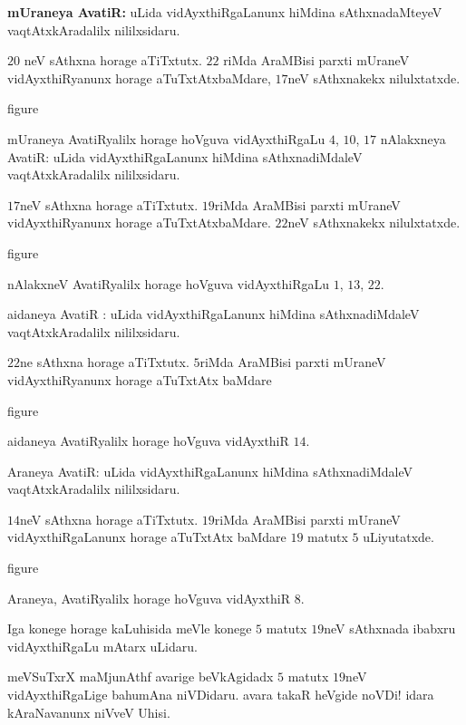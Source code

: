 {\bf mUraneya AvatiR:} uLida vidAyxthiRgaLanunx hiMdina sAthxnadaMteyeV vaqtAtxkAradalilx nililxsidaru.

$20$ neV sAthxna horage aTiTxtutx. $22$ riMda AraMBisi parxti mUraneV vidAyxthiRyanunx horage aTuTxtAtxbaMdare, $17$neV sAthxnakekx nilulxtatxde. 
\begin{center}
{\rm figure}
\end{center}

mUraneya AvatiRyalilx horage hoVguva vidAyxthiRgaLu $4$, $10$, $17$ nAlakxneya AvatiR: uLida vidAyxthiRgaLanunx hiMdina sAthxnadiMdaleV vaqtAtxkAradalilx nililxsidaru.

$17$neV sAthxna horage aTiTxtutx. $19$riMda AraMBisi parxti mUraneV vidAyxthiRyanunx horage aTuTxtAtxbaMdare. $22$neV sAthxnakekx nilulxtatxde. 


\begin{center}
{\rm figure}
\end{center}

nAlakxneV AvatiRyalilx horage hoVguva vidAyxthiRgaLu $1$, $13$, $22$.

aidaneya AvatiR : uLida vidAyxthiRgaLanunx hiMdina sAthxnadiMdaleV vaqtAtxkAradalilx nililxsidaru.

$22$ne sAthxna horage aTiTxtutx. $5$riMda AraMBisi parxti mUraneV vidAyxthiRyanunx horage aTuTxtAtx baMdare
\begin{center}
{\rm figure}
\end{center}

aidaneya AvatiRyalilx horage hoVguva vidAyxthiR $14$.

Araneya AvatiR: uLida vidAyxthiRgaLanunx hiMdina sAthxnadiMdaleV vaqtAtxkAradalilx nililxsidaru.

$14$neV sAthxna horage aTiTxtutx. $19$riMda AraMBisi parxti mUraneV vidAyxthiRgaLanunx horage aTuTxtAtx baMdare $19$ matutx $5$ uLiyutatxde. 
\begin{center}
{\rm figure}
\end{center}


Araneya, AvatiRyalilx horage hoVguva vidAyxthiR $8$.

Iga konege horage kaLuhisida meVle konege $5$ matutx $19$neV sAthxnada ibabxru vidAyxthiRgaLu mAtarx uLidaru.

meVSuTxrX maMjunAthf avarige beVkAgidadx $5$ matutx $19$neV vidAyxthiRgaLige bahumAna niVDidaru. avara takaR heVgide noVDi! idara kAraNavanunx niVveV Uhisi.
